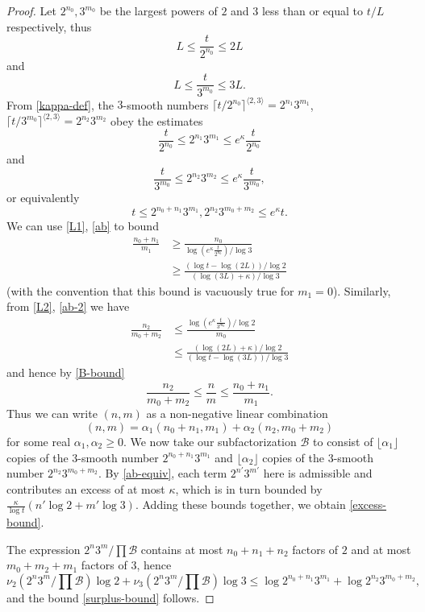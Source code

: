 \documentclass[12pt,a4paper,reqno]{amsart}
\numberwithin{equation}{section}
\theoremstyle{plain}
\theoremstyle{definition}
\newcommand\tuple{{\mathcal B}}
\begin{document}
\begin{proof}  Let $2^{n_0}, 3^{m_0}$ be the largest powers of $2$ and $3$ less than or equal to $t/L$ respectively, thus
\begin{equation}\label{L1}
 L \leq \frac{t}{2^{n_0}} \leq 2L
\end{equation}
  and
  \begin{equation}\label{L2}  L \leq \frac{t}{3^{m_0}} \leq 3L. \end{equation}
From \eqref{kappa-def}, the $3$-smooth numbers $\lceil t/2^{n_0} \rceil^{\langle 2,3 \rangle} = 2^{n_1} 3^{m_1} $, $\lceil t/3^{m_0} \rceil^{\langle 2,3 \rangle} = 2^{n_2} 3^{m_2}$ obey the estimates
\begin{equation}\label{ab} 
  \frac{t}{2^{n_0}} \leq 2^{n_1} 3^{m_1} \leq e^{\kappa} \frac{t}{2^{n_0}}
\end{equation}
and
\begin{equation}\label{ab-2}
 \frac{t}{3^{m_0}} \leq 2^{n_2} 3^{m_2} \leq e^{\kappa} \frac{t}{3^{m_0}},
\end{equation}
or equivalently
\begin{equation}\label{ab-equiv} 
  t \leq 2^{n_0+n_1} 3^{m_1}, 2^{n_2} 3^{m_0+m_2} \leq e^{\kappa} t.
\end{equation}
We can use \eqref{L1}, \eqref{ab} to bound
\begin{align*}
  \frac{n_0 + n_1}{m_1} &\geq \frac{n_0}{\log (e^{\kappa} \frac{t}{2^{n_0}}) / \log 3} \\
  &\geq \frac{(\log t - \log(2L)) / \log 2}{ (\log(3L)+\kappa) / \log 3 }
\end{align*}
(with the convention that this bound is vacuously true for $m_1=0$). Similarly, from \eqref{L2}, \eqref{ab-2} we have
\begin{align*}
  \frac{n_2}{m_0+m_2} &\leq \frac{\log(e^\kappa \frac{t}{3^{m_0}}) / \log 2}{m_0} \\
  &\leq \frac{(\log(2L)+\kappa)/\log 2}{(\log t-\log(3L))/\log 3}
\end{align*}
and hence by \eqref{B-bound}
\begin{equation}\label{m-wedge} \frac{n_2}{m_0+m_2} \leq \frac{n}{m} \leq \frac{n_0+n_1}{m_1}.
\end{equation}
Thus we can write $(n,m)$ as a non-negative linear combination
$$ (n,m) = \alpha_1 (n_0+n_1,m_1) + \alpha_2 (n_2,m_0+m_2)$$
for some real $\alpha_1, \alpha_2 \geq 0$. We now take our subfactorization $\tuple$ to consist of $\lfloor \alpha_1 \rfloor$ copies of the $3$-smooth number $2^{n_0+n_1} 3^{m_1}$ and $\lfloor \alpha_2 \rfloor$ copies of the $3$-smooth number $2^{n_2} 3^{m_0+m_2}$.  By \eqref{ab-equiv}, each term $2^{n'} 3^{m'}$ here is admissible and contributes an excess of at most $\kappa$, which is in turn bounded by $\frac{\kappa}{\log t} (n' \log 2 + m' \log 3)$.  Adding these bounds together, we obtain \eqref{excess-bound}.

The expression $2^n 3^m / \prod \tuple$ contains at most $n_0+n_1+n_2$ factors of $2$ and at most $m_0+m_2+m_1$ factors of $3$, hence
$$ \nu_2(2^n 3^m / \prod \tuple) \log 2 +
\nu_3(2^n 3^m / \prod \tuple) \log 3
\leq \log 2^{n_0+n_1} 3^{m_1} + \log 2^{n_2} 3^{m_0+m_2},$$
and the bound \eqref{surplus-bound} follows.
\end{proof}
\end{document}
